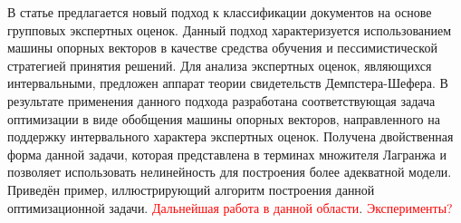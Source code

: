 \documentclass[12pt,a4paper,oneside]{article}
\begin{document}
\par
В статье предлагается новый подход к классификации документов на основе групповых экспертных оценок.
Данный подход характеризуется использованием машины опорных векторов в качестве средства обучения и пессимистической стратегией принятия решений. 
Для анализа экспертных оценок, являющихся интервальными, предложен аппарат теории свидетельств Демпстера-Шефера. 
В результате применения данного подхода разработана соответствующая задача оптимизации в виде обобщения машины опорных векторов, направленного на поддержку интервального характера экспертных оценок. 
Получена двойственная форма данной задачи, которая представлена в терминах множителя Лагранжа и позволяет использовать нелинейность для построения более адекватной модели. 
Приведён пример, иллюстрирующий алгоритм построения данной оптимизационной задачи. 
\textcolor{red}{Дальнейшая работа в данной области}. 
\textcolor{red}{Эксперименты?} 

\end{document}
